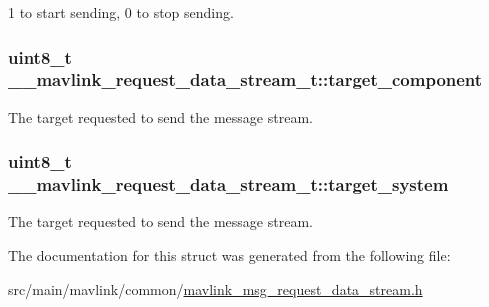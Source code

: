 1 to start sending, 0 to stop sending. 

\hypertarget{struct____mavlink__request__data__stream__t_aab4483f29d41d2e72070bd4295e1395f}{
\subsubsection[{target\+\_\+component}]{\setlength{\rightskip}{0pt plus 5cm}uint8\+\_\+t \+\_\+\+\_\+mavlink\+\_\+request\+\_\+data\+\_\+stream\+\_\+t\+::target\+\_\+component}}\label{struct____mavlink__request__data__stream__t_aab4483f29d41d2e72070bd4295e1395f}


The target requested to send the message stream. 

\hypertarget{struct____mavlink__request__data__stream__t_ad18b3be12f7ec2056677acd15c286d0a}{
\subsubsection[{target\+\_\+system}]{\setlength{\rightskip}{0pt plus 5cm}uint8\+\_\+t \+\_\+\+\_\+mavlink\+\_\+request\+\_\+data\+\_\+stream\+\_\+t\+::target\+\_\+system}}\label{struct____mavlink__request__data__stream__t_ad18b3be12f7ec2056677acd15c286d0a}


The target requested to send the message stream. 



The documentation for this struct was generated from the following file\+:\begin{DoxyCompactItemize}
\item 
src/main/mavlink/common/\hyperlink{mavlink__msg__request__data__stream_8h}{mavlink\+\_\+msg\+\_\+request\+\_\+data\+\_\+stream.\+h}\end{DoxyCompactItemize}
